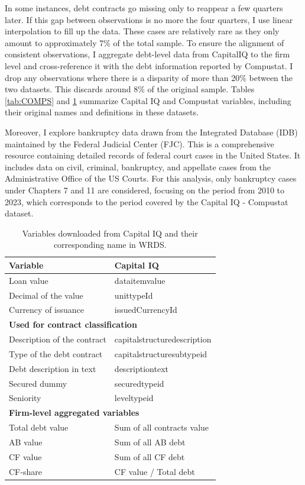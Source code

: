 \documentclass[12pt]{article}
\begin{document}
In some instances, debt contracts go missing only to reappear a few quarters later. If this gap between observations is no more the four quarters, I use linear interpolation to fill up the data. These cases are relatively rare as they only amount to approximately 7\% of the total sample. To ensure the alignment of consistent observations, I aggregate debt-level data from CapitalIQ to the firm level and cross-reference it with the debt information reported by Compustat. I drop any observations where there is a disparity of more than 20\% between the two datasets. This discards around 8\% of the original sample. Tables \ref{tab:COMPS} and \ref{tab:CAPIQ} summarize Capital IQ and Compustat variables, including their original names and definitions in these datasets. 

Moreover, I explore bankruptcy data drawn from the Integrated Database (IDB) maintained by the Federal Judicial Center (FJC). This is a comprehensive resource containing detailed records of federal court cases in the United States. It includes data on civil, criminal, bankruptcy, and appellate cases from the Administrative Office of the US Courts. For this analysis, only bankruptcy cases under Chapters 7 and 11 are considered, focusing on the period from 2010 to 2023, which corresponds to the period covered by the Capital IQ - Compustat dataset. 



\begin{table}[htbp]    

    \centering
    \begin{tabular}{ll}
    \toprule
    Variable & Capital IQ \\
    \midrule
    Loan value & dataitemvalue \\
    Decimal of the value & unittypeId \\
    Currency of issuance & issuedCurrencyId \vspace{3mm} \\
    \multicolumn{2}{l}{\textbf{Used for contract classification}} \\
    Description of the contract & capitalstructuredescription \\
    Type of the debt contract & capitalstructuresubtypeid \\
    Debt description in text & descriptiontext \\
    Secured dummy & securedtypeid \\
    Seniority & leveltypeid \vspace{3mm} \\
    \multicolumn{2}{l}{\textbf{Firm-level aggregated variables}} \\
    Total debt value & Sum of all contracts value \\
    AB value & Sum of all AB debt \\
    CF value & Sum of all CF debt \\
    CF-share & CF value / Total debt \\
    \bottomrule
    \end{tabular}
    \caption{\small Variables downloaded from Capital IQ and their corresponding name in WRDS.}
    \label{tab:CAPIQ}

\end{table}
\end{document}
